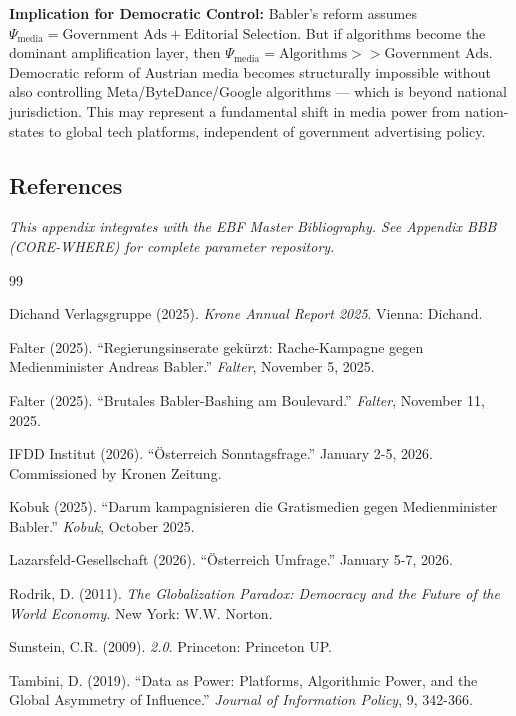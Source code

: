 \begin{enumerate}
  \textbf{Implication for Democratic Control:} Babler's reform assumes $\Psi_{\text{media}} =
  \text{Government Ads} + \text{Editorial Selection}$. But if algorithms become the
  dominant amplification layer, then $\Psi_{\text{media}} = \text{Algorithms} >> \text{Government Ads}$.
  Democratic reform of Austrian media becomes structurally impossible without also
  controlling Meta/ByteDance/Google algorithms — which is beyond national jurisdiction.
  This may represent a fundamental shift in media power from nation-states to global
  tech platforms, independent of government advertising policy.
\end{enumerate}


\subsection{References}

\textit{This appendix integrates with the EBF Master Bibliography.
See Appendix BBB (CORE-WHERE) for complete parameter repository.}

\nocite{bcm_master}

\begin{thebibliography}{99}

 Dichand Verlagsgruppe (2025). \textit{Krone Annual Report 2025}.
  Vienna: Dichand.

 Falter (2025). ``Regierungsinserate gekürzt: Rache-Kampagne
  gegen Medienminister Andreas Babler.'' \textit{Falter}, November 5, 2025.

 Falter (2025). ``Brutales Babler-Bashing am Boulevard.''
  \textit{Falter}, November 11, 2025.

 IFDD Institut (2026). ``Österreich Sonntagsfrage.'' January 2-5, 2026.
  Commissioned by Kronen Zeitung.

 Kobuk (2025). ``Darum kampagnisieren die Gratismedien gegen
  Medienminister Babler.'' \textit{Kobuk}, October 2025.

 Lazarsfeld-Gesellschaft (2026). ``Österreich Umfrage.''
  January 5-7, 2026.

 Rodrik, D. (2011). \textit{The Globalization Paradox: Democracy
  and the Future of the World Economy}. New York: W.W. Norton.

 Sunstein, C.R. (2009). \textit{2.0}. Princeton: Princeton UP.

 Tambini, D. (2019). ``Data as Power: Platforms, Algorithmic
  Power, and the Global Asymmetry of Influence.'' \textit{Journal of Information
  Policy}, 9, 342-366.

\end{thebibliography}



